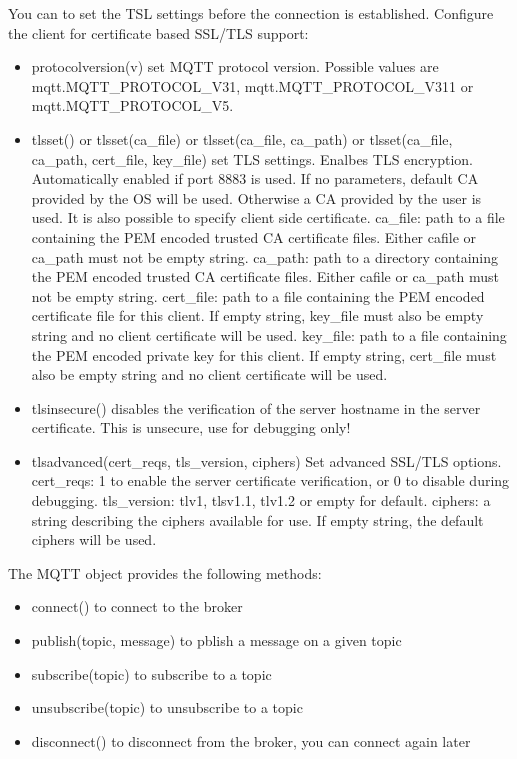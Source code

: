 You can to set the TSL settings before the connection is established.
Configure the client for certificate based SSL/TLS support:
\begin{itemize}
\item protocolversion(v) set MQTT protocol version. Possible values are mqtt.MQTT_PROTOCOL\_V31, mqtt.MQTT_PROTOCOL\_V311 or mqtt.MQTT\_PROTOCOL_V5.
\item tlsset() or tlsset(ca\_file) or tlsset(ca\_file, ca\_path) or tlsset(ca\_file, ca\_path, cert\_file, key\_file) set TLS settings.
Enalbes TLS encryption. Automatically enabled if port 8883 is used. If no parameters, default CA provided by the OS will be used.
Otherwise a CA provided by the user is used. It is also possible to specify client side certificate.
ca\_file: path to a file containing the PEM encoded trusted CA certificate files. Either cafile or ca\_path must not be empty string.
ca\_path: path to a directory containing the PEM encoded trusted CA certificate files. Either cafile or ca\_path must not be empty string.
cert\_file: path to a file containing the PEM encoded certificate file for this client. If empty string, key\_file must also be empty string and no client certificate will be used.
key\_file: path to a file containing the PEM encoded private key for this client. If empty string, cert\_file must also be empty string and no client certificate will be used.
\item tlsinsecure() disables the verification of the server hostname in the server certificate. This is unsecure, use for debugging only!
\item tlsadvanced(cert\_reqs, tls\_version, ciphers) Set advanced SSL/TLS options.
cert\_reqs: 1 to enable the server certificate verification, or 0 to disable during debugging.
tls\_version: tlv1, tlsv1.1, tlv1.2 or empty for default.
ciphers: a string describing the ciphers available for use. If empty string, the default ciphers will be used.
\end{itemize}

The MQTT object provides the following methods:
\begin{itemize}
\item connect() to connect to the broker
\item publish(topic, message) to pblish a message on a given topic
\item subscribe(topic) to subscribe to a topic
\item unsubscribe(topic) to unsubscribe to a topic
\item disconnect() to disconnect from the broker, you can connect again later
\end{itemize}

